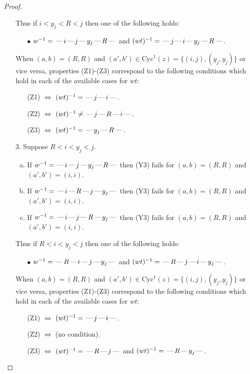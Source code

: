 \documentclass[10pt]{article}
\theoremstyle{definition}
\theoremstyle{definition}
\def\dash{\text{\hspace{0.5mm}---\hspace{0.5mm}}}
\def\Cyc{\mathrm{Cyc}}
\begin{document}
\begin{proof}
\begin{enumerate}
Thus if $i < y_j < R < j$ then one of the following holds:
\begin{enumerate}
\item[$\bullet$] $w^{-1} = \dash i\dash j\dash y_j\dash R\dash $ and $(wt)^{-1} = \dash j\dash i\dash y_j\dash R\dash $.
\end{enumerate}
When $(a,b)= (R,R)$ and $(a',b')\in \Cyc^1(z)=\{(i,j),(y_j,y_j)\}$ or vice versa,
properties (Z1)-(Z3) correspond to the following conditions which
hold in each of the available cases for $wt$:
\begin{enumerate}
\item[](Z1) $\Leftrightarrow$ $(wt)^{-1} = \dash j \dash i \dash$.
\item[](Z2) $\Leftrightarrow$ $(wt)^{-1} \neq \dash j \dash R \dash i \dash$.
\item[](Z3) $\Leftrightarrow$ $(wt)^{-1} = \dash y_j \dash R \dash$.
\end{enumerate}
\item[$3$.] Suppose $R < i < y_j < j$.
\begin{enumerate}[(a)]
\item If $w^{-1} = \dash i\dash j\dash y_j\dash R\dash $ then (Y3) fails for $(a,b)=(R,R)$ and $(a',b')=(i,i)$.
\item If $w^{-1} = \dash i\dash R\dash j\dash y_j\dash $ then (Y3) fails for $(a,b)=(R,R)$ and $(a',b')=(i,i)$.
\item If $w^{-1} = \dash i\dash j\dash R\dash y_j\dash $ then (Y3) fails for $(a,b)=(R,R)$ and $(a',b')=(i,i)$.
\end{enumerate}
Thus if $R < i < y_j < j$ then one of the following holds:
\begin{enumerate}
\item[$\bullet$] $w^{-1} = \dash R\dash i\dash j\dash y_j\dash $ and $(wt)^{-1} = \dash R\dash j\dash i\dash y_j\dash $.
\end{enumerate}
When $(a,b)= (R,R)$ and $(a',b')\in \Cyc^1(z)=\{(i,j),(y_j,y_j)\}$ or vice versa,
properties (Z1)-(Z3) correspond to the following conditions which
hold in each of the available cases for $wt$:
\begin{enumerate}
\item[](Z1) $\Leftrightarrow$ $(wt)^{-1} = \dash j \dash i \dash$.
\item[](Z2) $\Leftrightarrow$ (no condition).
\item[](Z3) $\Leftrightarrow$ $(wt)^{-1} = \dash R \dash j \dash$  and $(wt)^{-1} = \dash R \dash y_j \dash$.
\end{enumerate}

\end{enumerate}
\end{proof}
\end{document}
